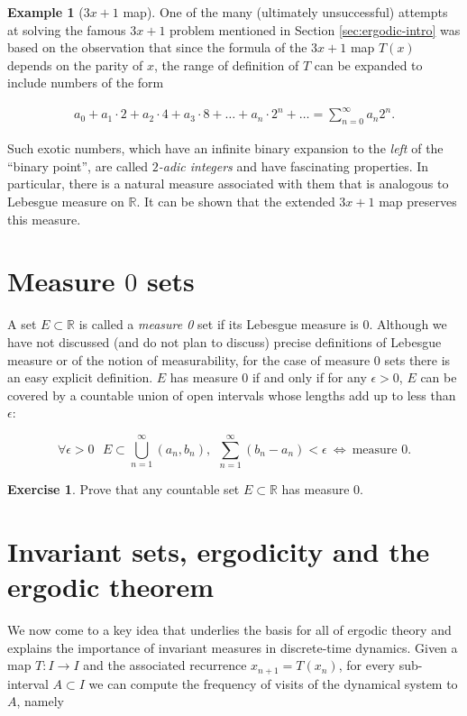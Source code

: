 \documentclass[11pt]{report}
\theoremstyle{plain}
\theoremstyle{definition}
\newtheorem{example}[thm]{Example}
\newtheorem{xexercise}[thm]{Exercise}
\begin{document}
\begin{example}[$3x+1$ map]
One of the many (ultimately unsuccessful) attempts at
solving the famous $3x+1$ problem mentioned in
Section \ref{sec:ergodic-intro} was based on the
observation that since the formula of the $3x+1$ map
$T(x)$ depends on the parity of $x$, the range of
definition of $T$ can be expanded to include numbers
of the form

\begin{align*}
a_0 + a_1 \cdot 2 + a_2 \cdot 4 + a_3\cdot 8 + \ldots + a_n \cdot 2^n + \ldots = \sum_{n=0}^\infty a_n 2^n.
\end{align*}

Such exotic numbers, which have an infinite binary
expansion to the \emph{left} of the ``binary point'', are
called \emph{$2$-adic integers} and have fascinating
properties. In particular, there is a natural measure
associated with them that is analogous to Lebesgue
measure on $\mathbb{R}$. It can be shown that the
extended $3x+1$ map preserves this measure.
\end{example}

\section{Measure $0$ sets}
A set $E\subset \mathbb{R}$ is called a \emph{measure 0}
set if its Lebesgue measure is 0. Although we have not
discussed (and do not plan to discuss) precise
definitions of Lebesgue measure or of the notion of
measurability, for the case of measure 0 sets there is
an easy explicit definition. $E$ has measure 0 if and
only if for any $\epsilon>0$, $E$ can be covered by a
countable union of open intervals whose lengths add up
to less than $\epsilon$:

\[
\forall \epsilon>0\ \ \ E\subset\bigcup_{n=1}^\infty (a_n, b_n), \ \  \sum_{n=1}^\infty (b_n-a_n) < \epsilon \ \iff \ \textrm{measure 0.}
\]

\begin{xexercise}
Prove that any countable set $E\subset \mathbb{R}$
has measure 0.
\end{xexercise}

\section{Invariant sets, ergodicity and the ergodic theorem}
We now come to a key idea that underlies the basis
for all of ergodic theory and explains the importance
of invariant measures in discrete-time dynamics. Given
a map $T:I\to I$ and the associated recurrence
$x_{n+1}=T(x_n)$, for every sub-interval $A\subset I$
we can compute the frequency of visits of the
dynamical system to $A$, namely
\end{document}
